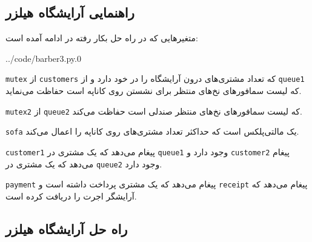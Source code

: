 \documentclass{book}
\newcommand{\clearemptydoublepage}{\newpage\cleardoublepage}
\begin{document}
\subsection{راهنمایی آرایشگاه هیلزر}

    متغیرهایی که در راه حل بکار رفته در ادامه آمده است:‌

\begin{latin}
%

{../code/barber3.py.0}
\end{latin}

    {\tt mutex}
    از {\tt customers} که تعداد مشتری‌های درون آرایشگاه را در خود دارد و  از {\tt queue1} که لیست سمافورهای نخ‌های منتظر برای نشستن 
    روی کاناپه است حفاظت می‌نماید. 

    {\tt mutex2} 
    از {\tt queue2} که لیست سمافورهای نخ‌های منتظر صندلی است حفاظت می‌کند. 


    {\tt sofa} 
    یک مالتی‌پلکس است که حداکثر تعداد مشتری‌های روی کاناپه را اعمال می‌کند. 

    {\tt customer1}
    پیغام می‌دهد که یک مشتری در  {\tt queue1} وجود دارد و {\tt customer2} پیغام می‌دهد که یک مشتری در  {\tt queue2} وجود دارد. 


     {\tt payment}
    پیغام می‌دهد که یک مشتری پرداخت داشته است و {\tt receipt} پیغام می‌دهد که آرایشگر اجرت را دریافت کرده است. 


\clearemptydoublepage
\subsection {راه حل آرایشگاه هیلزر}
\end{document}
